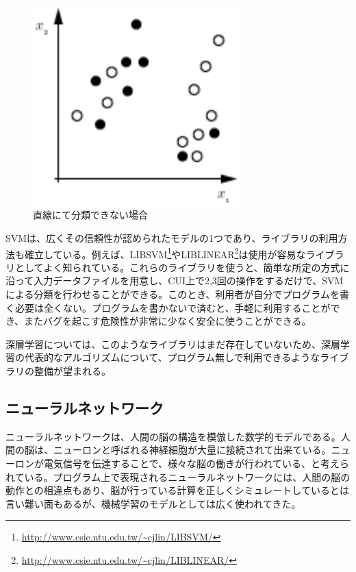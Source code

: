 \begin{figure}[tbp]
 \centering
  \includegraphics[width=80mm]{img/c2/svm_mixed}
 \caption{直線にて分類できない場合}
 \label{c2_svm_mixed}
\end{figure}
SVMは、広くその信頼性が認められたモデルの1つであり、ライブラリの利用方法も確立している。例えば、LIBSVM\footnote{\url{http://www.csie.ntu.edu.tw/~cjlin/LIBSVM/}}やLIBLINEAR\footnote{\url{http://www.csie.ntu.edu.tw/~cjlin/LIBLINEAR/}}は使用が容易なライブラリとしてよく知られている。これらのライブラリを使うと、簡単な所定の方式に沿って入力データファイルを用意し、CUI上で2,3回の操作をするだけで、SVMによる分類を行わせることができる。このとき、利用者が自分でプログラムを書く必要は全くない。プログラムを書かないで済むと、手軽に利用することができ、またバグを起こす危険性が非常に少なく安全に使うことができる。\par
深層学習については、このようなライブラリはまだ存在していないため、深層学習の代表的なアルゴリズムについて、プログラム無しで利用できるようなライブラリの整備が望まれる。
\subsection{ニューラルネットワーク}
ニューラルネットワークは、人間の脳の構造を模倣した数学的モデルである。人間の脳は、ニューロンと呼ばれる神経細胞が大量に接続されて出来ている。ニューロンが電気信号を伝達することで、様々な脳の働きが行われている、と考えられている。プログラム上で表現されるニューラルネットワークには、人間の脳の動作との相違点もあり、脳が行っている計算を正しくシミュレートしているとは言い難い面もある\cite{chuanrenguangnan1998naonojisuanlilun}が、機械学習のモデルとしては広く使われてきた。\par

